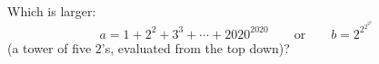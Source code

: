 Which is larger:
\[a=1+2^2+3^3+\cdots+2020^{2020}\qquad\text{or}\qquad b=2^{2^{2^{2^{2}}}}\]
(a tower of five $2$'s, evaluated from the top down)?
